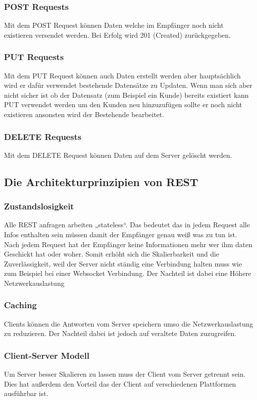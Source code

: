 \subsubsection{POST Requests}
Mit dem POST Request können Daten welche im Empfänger noch nicht existieren versendet werden. Bei Erfolg wird 201 (Created) zurückgegeben.
\subsubsection{PUT Requests}
Mit dem PUT Request können auch Daten erstellt werden aber hauptsächlich wird er dafür verwendet bestehende Datensätze zu Updaten. Wenn man sich aber nicht sicher ist ob der Datensatz (zum Beispiel ein Kunde) bereits existiert kann PUT verwendet werden um den Kunden neu hinzuzufügen sollte er noch nicht existieren ansonsten wird der Bestehende bearbeitet.
\subsubsection{DELETE Requests}
Mit dem DELETE Request können Daten auf dem Server gelöscht werden. 
\subsection{Die Architekturprinzipien von REST}
\subsubsection{Zustandslosigkeit}
Alle REST anfragen arbeiten „stateless“. Das bedeutet das in jedem Request alle Infos enthalten sein müssen damit der Empfänger genau weiß was zu tun ist. Nach jedem Request hat der Empfänger keine Informationen mehr wer ihm daten Geschickt hat oder woher. Somit erhöht sich die Skalierbarkeit und die Zuverlässigkeit, weil der Server nicht ständig eine Verbindung halten muss wie zum Beispiel bei einer Websocket Verbindung. Der Nachteil ist dabei eine Höhere Netzwerkauslastung 
\subsubsection{Caching}
Clients können die Antworten vom Server speichern umso die Netzwerkauslastung zu reduzieren. Der Nachteil dabei ist jedoch auf veraltete Daten zuzugreifen.
\subsubsection{Client-Server Modell}
Um Server besser Skalieren zu lassen muss der Client vom Server getrennt sein. Dies hat außerdem den Vorteil das der Client auf verschiedenen Plattformen ausführbar ist.
